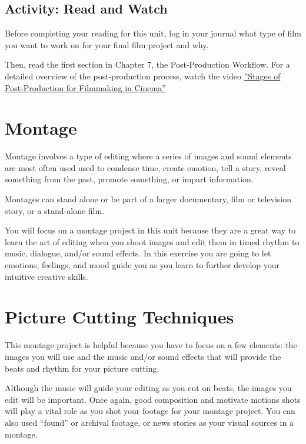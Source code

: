 \documentclass[
]{book}
\begin{document}
\hypertarget{activity-read-and-watch}{%
\subsection*{Activity: Read and Watch}\label{activity-read-and-watch}}

\begin{reflect}
Before completing your reading for this unit, log in your journal what type of film you want to work on for your final film project and why.

Then, read the first section in Chapter 7, the Post-Production Workflow. For a detailed overview of the post-production process, watch the video \href{https://www.youtube.com/watch?v=IFjyVW21Vpw}{''Stages of Post-Production for Filmmaking in Cinema''}
\end{reflect}

\hypertarget{montage}{%
\section{Montage}\label{montage}}

Montage involves a type of editing where a series of images and sound elements are most often used used to condense time, create emotion, tell a story, reveal something from the past, promote something, or impart information.

Montages can stand alone or be part of a larger documentary, film or television story, or a stand-alone film.

You will focus on a montage project in this unit because they are a great way to learn the art of editing when you shoot images and edit them in timed rhythm to music, dialogue, and/or sound effects. In this exercise you are going to let emotions, feelings, and mood guide you as you learn to further develop your intuitive creative skills.

\hypertarget{picture-cutting-techniques}{%
\section{Picture Cutting Techniques}\label{picture-cutting-techniques}}

This montage project is helpful because you have to focus on a few elements: the images you will use and the music and/or sound effects that will provide the beats and rhythm for your picture cutting.

Although the music will guide your editing as you cut on beats, the images you edit will be important. Once again, good composition and motivate motions shots will play a vital role as you shot your footage for your montage project. You can also used ``found'' or archival footage, or news stories as your visual sources in a montage.
\end{document}
